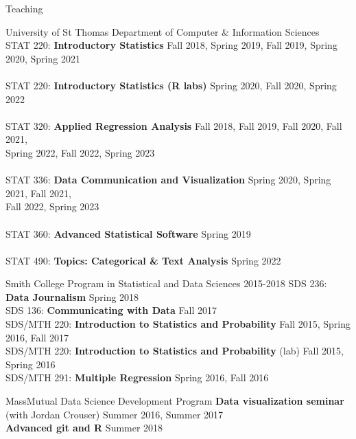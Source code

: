 \documentclass{resume} %
\begin{document}
\begin{rSection}{Teaching}

\begin{reSubsection}{University of St Thomas }{Department of Computer \& Information Sciences }{}{
\\ STAT 220: \textbf{Introductory Statistics} \hfill Fall 2018, Spring 2019, Fall 2019, Spring 2020, Spring 2021 \\ \\
STAT 220: \textbf{Introductory Statistics (R labs)} \hfill Spring 2020, Fall 2020, Spring 2022 \\ \\
STAT 320: \textbf{Applied Regression Analysis} \hfill Fall 2018, Fall 2019, Fall 2020, Fall 2021, \\
\hspace*{\fill} Spring 2022, Fall 2022, Spring 2023 \\ \\
STAT 336: \textbf{Data Communication and Visualization} \hfill Spring 2020, Spring 2021, Fall 2021, \\
\hspace*{\fill} Fall 2022, Spring 2023 \\ \\
STAT 360: \textbf{Advanced Statistical Software} \hfill Spring 2019\\ \\
STAT 490: \textbf{Topics: Categorical \& Text Analysis} \hfill Spring 2022\\}
\end{reSubsection}

\begin{reSubsection}{Smith College }{ Program in Statistical and Data Sciences }{2015-2018}{
SDS 236: \textbf{Data Journalism} \hfill Spring 2018 \\
SDS 136: \textbf{Communicating with Data} \hfill Fall 2017 \\
SDS/MTH 220: \textbf{Introduction to Statistics and Probability}  \hfill Fall 2015, Spring 2016, Fall 2017 \\
SDS/MTH 220: \textbf{Introduction to Statistics and Probability} (lab) \hfill Fall 2015, Spring 2016 \\
SDS/MTH 291: \textbf{Multiple Regression} \hfill Spring 2016, Fall 2016\\}
\end{reSubsection}

\begin{reSubsection}{MassMutual }{ Data Science Development Program }{}{
\textbf{Data visualization seminar} (with Jordan Crouser) \hfill Summer 2016, Summer 2017\\
\textbf{Advanced git and R} \hfill Summer 2018 \\}
\end{reSubsection}


\end{rSection}
\end{document}
